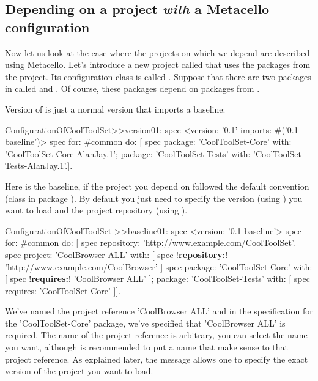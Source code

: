 \documentclass[a4paper,10pt,twoside]{book}
\begin{document}
\subsection{Depending on a project \emph{with} a Metacello configuration}
Now let us look at the case where the projects on which we depend are described using Metacello.
Let's introduce a new project called  that uses the packages from the  project.  Its configuration class is called .   Suppose that there are two packages in  called  and . Of course, these packages depend on packages from . 

Version  of  is just a normal version that imports a baseline:
\begin{code}{}
ConfigurationOfCoolToolSet>>version01: spec 
       <version: '0.1' imports: #('0.1-baseline')>
       spec for: #common do: [
              spec 
                     package: 'CoolToolSet-Core' with: 'CoolToolSet-Core-AlanJay.1';
                     package: 'CoolToolSet-Tests' with: 'CoolToolSet-Tests-AlanJay.1'.].       
\end{code}       

\noindent
Here is the baseline, if the project you depend on followed the default convention (\ie class  in package ). By default you just need to specify the version (using ) you want to load and the project repository (using ). 

\begin{code}{}
ConfigurationOfCoolToolSet >>baseline01: spec 
       <version: '0.1-baseline'>
       spec for: #common do: [
              spec repository: 'http://www.example.com/CoolToolSet'.
              spec project: 'CoolBrowser ALL' with: [
                            spec !\textbf{repository:}! 'http://www.example.com/CoolBrowser' ]
              spec 
                     package: 'CoolToolSet-Core' with: [ spec !\textbf{requires:}! 'CoolBrowser ALL' ];
                     package: 'CoolToolSet-Tests' with: [ spec requires: 'CoolToolSet-Core' ]].
\end{code}  
   


We've named the project reference 'CoolBrowser ALL' and in the specification for the 'CoolToolSet-Core' package, we've specified that 'CoolBrowser ALL' is required. The name of the project reference is arbitrary, you can select the name you want, although is recommended to put a name that make sense to that project reference. As explained later, the message  allows one to specify the exact version of the project you want to load.
\end{document}
